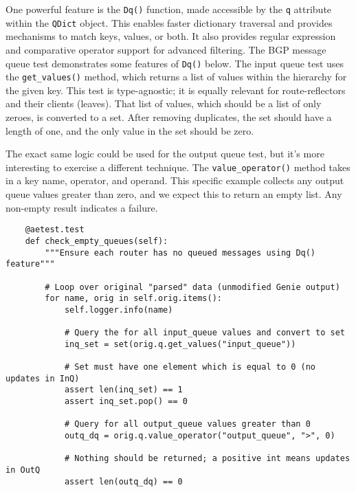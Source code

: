 One powerful feature is the \verb|Dq()| function, made accessible by the
\verb|q| attribute within the \verb|QDict| object. This enables faster
dictionary traversal and provides mechanisms to match keys, values, or both.
It also provides regular expression and comparative operator support for
advanced filtering. The BGP message queue test demonstrates some features
of \verb|Dq()| below. The input queue test uses the \verb|get_values()|
method, which returns a list of values within the hierarchy for the given
key. This test is type-agnostic; it is equally relevant for route-reflectors
and their clients (leaves). That list of values, which should be a list of
only zeroes, is converted to a set. After removing duplicates, the set
should have a length of one, and the only value in the set should be zero.

The exact same logic could be used for the output queue test, but it's
more interesting to exercise a different technique. The \verb|value_operator()|
method takes in a key name, operator, and operand. This specific example
collects any output queue values greater than zero, and we expect this to
return an empty list. Any non-empty result indicates a failure.

\begin{verbatim}
    @aetest.test
    def check_empty_queues(self):
        """Ensure each router has no queued messages using Dq() feature"""

        # Loop over original "parsed" data (unmodified Genie output)
        for name, orig in self.orig.items():
            self.logger.info(name)

            # Query the for all input_queue values and convert to set
            inq_set = set(orig.q.get_values("input_queue"))

            # Set must have one element which is equal to 0 (no updates in InQ)
            assert len(inq_set) == 1
            assert inq_set.pop() == 0

            # Query for all output_queue values greater than 0
            outq_dq = orig.q.value_operator("output_queue", ">", 0)

            # Nothing should be returned; a positive int means updates in OutQ
            assert len(outq_dq) == 0
\end{verbatim}

